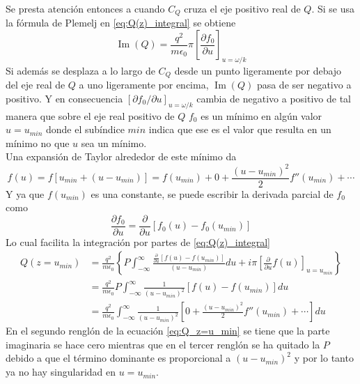 \documentclass[../tesis_main_file.tex]{subfile}
\begin{document}
Se presta atención entonces a cuando $C_Q$ cruza el eje positivo real de $Q$. Si se usa la fórmula de Plemelj en \ref{eq:Q(z)_integral} se obtiene
\begin{equation}
\operatorname{Im}(Q) = \frac{q^2}{m\epsilon _0}\pi \left[\frac{\partial f_0}{\partial u}\right]_{u= \omega /k}
\end{equation}
Si además se desplaza a lo largo de $C_Q$ desde un punto ligeramente por debajo del eje real de $Q$ a uno ligeramente por encima, $\operatorname{Im}(Q)$ pasa de ser negativo a positivo. Y en consecuencia $[\partial f_0 / \partial u]_{u = \omega /k}$ cambia de negativo a positivo de tal manera que sobre el eje real positivo de $Q$ $f_0$ es un mínimo en algún valor $u=u_{min}$ donde el subíndice $min$ indica que ese es el valor que resulta en un mínimo no que $u$ sea un mínimo.\\
Una expansión de Taylor alrededor de este mínimo da
\begin{equation}
\label{eq:taylor_min_Penrose}
f(u) =f[u_{min}+(u-u_{min})] = f(u_{min})+0+\frac{(u -u_{min})^2}{2}f''(u_{min})+ \cdots
\end{equation}
Y ya que $f(u_{min})$ es una constante, se puede escribir la derivada parcial de $f_0$ como
\begin{equation}
\frac{\partial f_0}{\partial u} = \frac{\partial}{\partial u}\left[f_0(u)-f_0(u_{min})\right]
\end{equation}
Lo cual facilita la integración por partes de \ref{eq:Q(z)_integral}
\begin{equation}
\label{eq:Q_z=u_min}
\begin{split}
Q\left( z=u_{min}\right) &=\frac{q^2}{m\epsilon _0}\left\lbrace P\int ^{\infty}_{-\infty} \frac{\frac{\partial}{\partial u}\left[f(u)-f(u_{min})\right]}{(u-u_{min})}du + i\pi \left[\frac{\partial}{\partial u}f(u)\right]_{u=u_{min}}\right\rbrace\\
&=\frac{q^2}{m\epsilon _0}P\int ^{\infty}_{-\infty} \frac{1}{(u-u_{min})^2}\left[ f(u)-f(u_{min})\right]du\\
&= \frac{q^2}{m\epsilon _0}\int ^{\infty}_{-\infty}\frac{1}{(u-u_{min})^2} \left[0+\frac{(u-u_{min})^2}{2}f''(u_{min})+\cdots \right]du
\end{split}
\end{equation}
En el segundo renglón de la ecuación \ref{eq:Q_z=u_min} se tiene que la parte imaginaria se hace cero  mientras que en el tercer renglón se ha quitado la $P$ debido a que el término dominante es proporcional a $(u-u_{min})^2$ y por lo tanto ya no hay singularidad en $u=u_{min}$.\\
\end{document}

